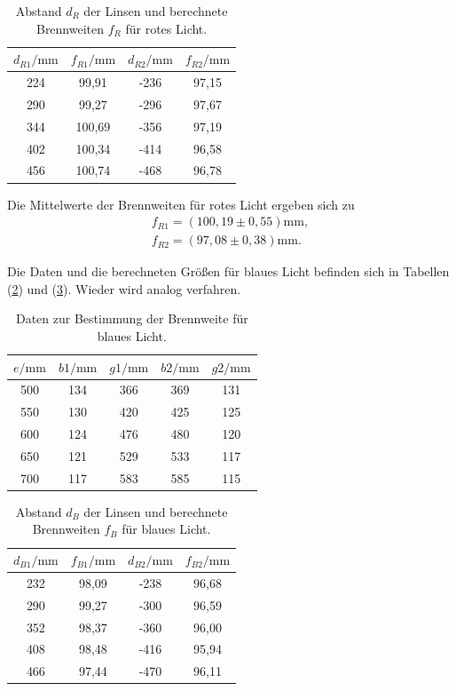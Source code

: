 \begin{table}[H]
\centering
\caption{Abstand $d_R$ der Linsen und berechnete Brennweiten $f_R$ für rotes Licht.}
\label{tab:einzel5}
\begin{tabular}{c c c c}
\toprule
$d_{R1}/\si{\milli\meter}$ & $f_{R1}/\si{\milli\meter}$ & $d_{R2}/\si{\milli\meter}$ & $f_{R2}/\si{\milli\meter}$ \\
\midrule
224 & 99,91 & -236 & 97,15\\
290 & 99,27 & -296 & 97,67\\
344 & 100,69 & -356 & 97,19\\
402 & 100,34 & -414 & 96,58\\
456 & 100,74 & -468 & 96,78\\
\bottomrule
\end{tabular}
\end{table}

Die Mittelwerte der Brennweiten für rotes Licht ergeben sich zu
\begin{align*}
f_{R1} = (100,19 \pm 0,55) \si{\milli\meter}, \\
f_{R2} = (97,08 \pm 0,38) \si{\milli\meter} .
\end{align*}

 \noindent Die Daten und die berechneten Größen für blaues Licht befinden sich in Tabellen (\ref{tab:einzel6}) und (\ref{tab:einzel7}). Wieder wird analog verfahren.


\begin{table}[H]
\centering
\caption{Daten zur Bestimmung der Brennweite für blaues Licht.}
\label{tab:einzel6}
\begin{tabular}{c c c c c}
\toprule
$e/\si{\milli\meter}$ &$b1/\si{\milli\meter}$ & $g1/\si{\milli\meter}$ & $b2/\si{\milli\meter}$ & $g2/\si{\milli\meter}$ \\
\midrule
500 &134 & 366 & 369 & 131\\
550 &130 & 420 & 425 & 125\\
600 &124 & 476 & 480 & 120\\
650 &121 & 529 & 533 & 117\\
700 &117 & 583 & 585 & 115\\
\bottomrule
\end{tabular}
\end{table}

\begin{table}[H]
\centering
\caption{Abstand $d_B$ der Linsen und berechnete Brennweiten $f_B$ für blaues Licht.}
\label{tab:einzel7}
\begin{tabular}{c c c c}
\toprule
$d_{B1}/\si{\milli\meter}$ & $f_{B1}/\si{\milli\meter}$ & $d_{B2}/\si{\milli\meter}$ & $f_{B2}/\si{\milli\meter}$ \\
\midrule
232 & 98,09 & -238 & 96,68\\
290 & 99,27 & -300 & 96,59\\
352 & 98,37 & -360 & 96,00\\
408 & 98,48 & -416 & 95,94\\
466 & 97,44 & -470 & 96,11\\
\bottomrule
\end{tabular}
\end{table}

